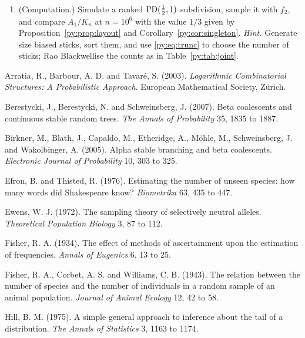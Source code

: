 \begin{enumerate}[label=\arabic*., leftmargin=*]
\item (Computation.) Simulate a ranked $\mathrm{PD}(\tfrac12,1)$ subdivision, sample it with $f_2$, and
compare $A_1/K_n$ at $n = 10^{6}$ with the value $1/3$ given by Proposition~\ref{py:prop:layout}
and Corollary~\ref{py:cor:singleton}.
\emph{Hint.} Generate size biased sticks, sort them, and use \eqref{py:eq:trunc} to choose the
number of sticks; Rao Blackwellise the counts as in Table~\ref{py:tab:joint}.
\end{enumerate}

\begin{thebibliography}{}

Arratia, R., Barbour, A. D. and Tavar\'e, S. (2003). \emph{Logarithmic Combinatorial Structures: A
Probabilistic Approach}. European Mathematical Society, Z\"urich.

Berestycki, J., Berestycki, N. and Schweinsberg, J. (2007). Beta coalescents and continuous stable
random trees. \emph{The Annals of Probability} 35, 1835 to 1887.

Birkner, M., Blath, J., Capaldo, M., Etheridge, A., M\"ohle, M., Schweinsberg, J. and
Wakolbinger, A. (2005). Alpha stable branching and beta coalescents. \emph{Electronic Journal of
Probability} 10, 303 to 325.

Efron, B. and Thisted, R. (1976). Estimating the number of unseen species: how many words did
Shakespeare know? \emph{Biometrika} 63, 435 to 447.

Ewens, W. J. (1972). The sampling theory of selectively neutral alleles. \emph{Theoretical
Population Biology} 3, 87 to 112.

Fisher, R. A. (1934). The effect of methods of ascertainment upon the estimation of frequencies.
\emph{Annals of Eugenics} 6, 13 to 25.

Fisher, R. A., Corbet, A. S. and Williams, C. B. (1943). The relation between the number of
species and the number of individuals in a random sample of an animal population.
\emph{Journal of Animal Ecology} 12, 42 to 58.

Hill, B. M. (1975). A simple general approach to inference about the tail of a distribution.
\emph{The Annals of Statistics} 3, 1163 to 1174.


\end{thebibliography}
